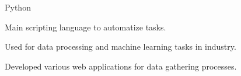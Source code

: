 \begin{cvskills}
\cvskill
{Python}
{
    \begin{cvitems}
    \item Main scripting language to automatize tasks.
    \item Used for data processing and machine learning tasks in industry.
    \item Developed various web applications for data gathering processes.
    \end{cvitems}
}
\vspace{-.5cm}
\vspace{-.5cm}

\end{cvskills}
